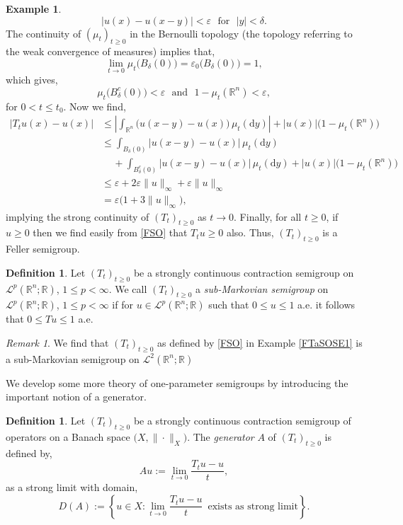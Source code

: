 \documentclass[a4paper, 12pt]{report}
\theoremstyle{remark}
\newtheorem{remark}[theorem]{Remark}
\theoremstyle{definition}
\newtheorem{definition}[theorem]{Definition}
\newtheorem{example}[theorem]{Example}
\begin{document}
\begin{example}
$$
|u(x) - u(x - y)| < \varepsilon \,\,\,\, \text{for } \,\, |y| < \delta.
$$
The continuity of $(\mu_t)_{t \ge 0}$ in the Bernoulli topology (the topology referring to the weak convergence of measures) implies that,
$$
\lim_{t \to 0}\mu_t\big(B_\delta(0)\big) = \varepsilon_0\big(B_\delta(0)\big) = 1,
$$
which gives,
$$
\mu_t\big(B_\delta^c(0)\big) < \varepsilon \,\,\,\, \text{and } \,\, 1 - \mu_t(\mathbb{R}^n) < \varepsilon,
$$
for $0 < t \le t_0$.  Now we find,
$$
\begin{aligned}
|T_tu(x) - u(x)| & \le \left|\int_{\mathbb{R}^n}\big(u(x - y) - u(x)\big)\,\mu_t(\mathrm{d}y)\right| + |u(x)|\big(1 - \mu_t(\mathbb{R}^n)\big)\\
& \le \int_{B_\delta(0)}|u(x - y) - u(x)|\,\mu_t(\mathrm{d}y)\\
& \,\,\,\,\,\,\, + \int_{B_\delta^c(0)}|u(x - y) - u(x)|\,\mu_t(\mathrm{d}y) + |u(x)|\big(1 - \mu_t(\mathbb{R}^n)\big)\\
& \le \varepsilon + 2\varepsilon\|u\|_\infty + \varepsilon\|u\|_\infty\\
& = \varepsilon\big(1 + 3\|u\|_\infty\big),
\end{aligned}
$$
implying the strong continuity of $(T_t)_{t \ge 0}$ as $t \to 0$.  Finally, for all $t \ge 0$, if $u \ge 0$ then we find easily from \eqref{FSO} that $T_tu \ge 0$ also.  Thus, $(T_t)_{t \ge 0}$ is a Feller semigroup.
\end{example}

\begin{definition}
Let $(T_t)_{t \ge 0}$ be a strongly continuous contraction semigroup on $\mathcal{L}^p(\mathbb{R}^n; \mathbb{R})$, $1 \le p < \infty$.  We call $(T_t)_{t \ge 0}$ a \emph{sub-Markovian semigroup} on $\mathcal{L}^p(\mathbb{R}^n; \mathbb{R})$, $1 \le p < \infty$ if for $u \in \mathcal{L}^p(\mathbb{R}^n; \mathbb{R})$ such that $0 \le u \le 1$ a.e. it follows that $0 \le Tu \le 1$ a.e.
\end{definition}
\begin{remark}
We find that $(T_t)_{t \ge 0}$ as defined by \eqref{FSO} in Example \ref{FTaSOSE1} is a sub-Markovian semigroup on $\mathcal{L}^2(\mathbb{R}^n; \mathbb{R})$
\end{remark}

We develop some more theory of one-parameter semigroups by introducing the important notion of a generator.
\begin{definition}
Let $(T_t)_{t \ge 0}$ be a strongly continuous contraction semigroup of operators on a Banach space $\big(X, \|\cdot\|_X\big)$.  The \emph{generator} $A$ of $(T_t)_{t \ge 0}$ is defined by,
\begin{equation}
Au := \lim_{t \to 0}\frac{T_tu - u}{t},
\end{equation}
as a strong limit with domain,
\begin{equation}
D(A) := \left\{u \in X : \lim_{t \to 0}\frac{T_tu - u}{t} \,\,\, \text{exists as strong limit}\right\}.
\end{equation}
\end{definition}
\end{document}
